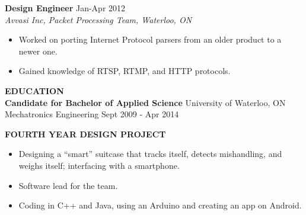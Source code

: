 \documentclass{letter}
\begin{document}
{\bf Design Engineer} \hfill Jan-Apr 2012 \\
{\sl Avvasi Inc, Packet Processing Team, Waterloo, ON}
\begin{itemize}
\item Worked on porting Internet Protocol parsers from an older product to a newer one.
\item Gained knowledge of RTSP, RTMP, and HTTP protocols.
\end{itemize}

{\large\bf EDUCATION} \\
{\bf Candidate for Bachelor of Applied Science} \hfill University of Waterloo, ON \\
Mechatronics Engineering \hfill Sept 2009 - Apr 2014

{\large\bf FOURTH YEAR DESIGN PROJECT}
\begin{itemize}
\item Designing a ``smart'' suitcase that tracks itself, detects mishandling, and weighs itself; interfacing with a smartphone.
\item Software lead for the team.
\item Coding in C++ and Java, using an Arduino and creating an app on Android.
\end{itemize}
\end{document}
